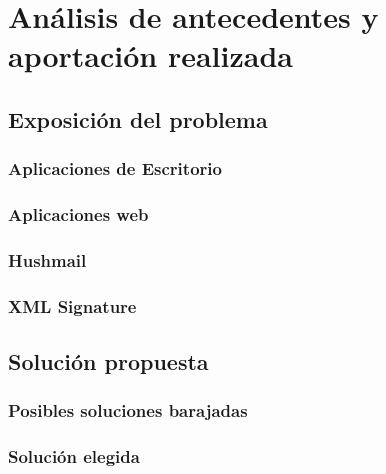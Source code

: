 \chapter{Análisis de antecedentes y aportación realizada}\label{antecedentes}
\section{Exposición del problema}\label{exposicionproblema}
\subsection{Aplicaciones de Escritorio}\label{aplicacionesdeescritorio}
\subsection{Aplicaciones web}\label{aplicacionesweb}
\subsection{Hushmail}\label{hushmail}
\subsection{XML Signature}\label{xmlsignature}
\section{Solución propuesta}\label{solucionpropuesta}
\subsection{Posibles soluciones barajadas}\label{posiblessoluciones}
\subsection{Solución elegida}\label{solucionelegida}